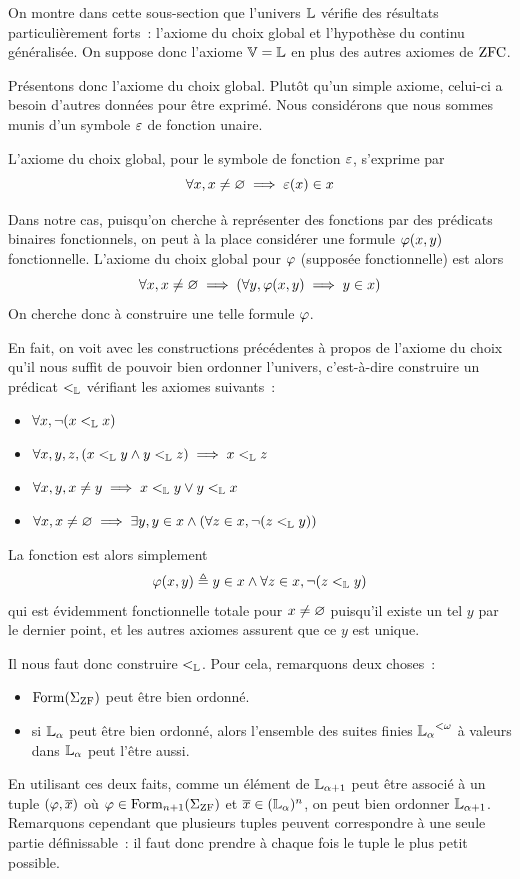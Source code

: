 On montre dans cette sous-section que l'univers $\mathbb L$ vérifie des résultats
particulièrement forts~: l'axiome du choix global et l'hypothèse du continu
généralisée. On suppose donc l'axiome $\mathbb V = \mathbb L$ en plus des autres axiomes de
$\operatorname{ZFC}$.

Présentons donc l'axiome du choix global. Plutôt qu'un simple axiome, celui-ci
a besoin d'autres données pour être exprimé. Nous considérons que nous sommes
munis d'un symbole $\varepsilon$ de fonction unaire.

\begin{axiom}
  L'axiome du choix global, pour le symbole de fonction $\varepsilon$, s'exprime par
  \[\forall x, x\neq \varnothing \implies \varepsilon(x)\in x\]
\end{axiom}

Dans notre cas, puisqu'on cherche à représenter des fonctions par des prédicats
binaires fonctionnels, on peut à la place considérer une formule $\varphi(x,y)$
fonctionnelle. L'axiome du choix global pour $\varphi$ (supposée fonctionnelle)
est alors
\[\forall x, x \neq \varnothing \implies (\forall y, \varphi(x,y)\implies y\in x)\]
On cherche donc à construire une telle formule $\varphi$.

En fait, on voit avec les constructions précédentes à propos de l'axiome du
choix qu'il nous suffit de pouvoir bien ordonner l'univers, c'est-à-dire
construire un prédicat $<_{\mathbb L}$ vérifiant les axiomes suivants~:
\begin{itemize}
\item $\forall x, \lnot(x <_{\mathbb L} x)$
\item $\forall x,y,z, (x <_{\mathbb L} y \land y <_{\mathbb L} z) \implies x <_{\mathbb L} z$
\item $\forall x,y, x\neq y \implies x <_{\mathbb L} y \lor y <_{\mathbb L} x$
\item $\forall x, x\neq \varnothing \implies
  \exists y, y \in x \land (\forall z \in x, \lnot (z <_{\mathbb L} y))$
\end{itemize}
La fonction est alors simplement
\[\varphi(x,y) \triangleq y \in x \land \forall z \in x, \lnot(z <_{\mathbb L} y)\]
qui est évidemment fonctionnelle totale pour $x\neq \varnothing$ puisqu'il existe un
tel $y$ par le dernier point, et les autres axiomes assurent que ce $y$ est
unique.

Il nous faut donc construire $<_{\mathbb L}$. Pour cela, remarquons deux choses~:
\begin{itemize}
\item $\operatorname{Form}(\Sigma_{\operatorname{ZF}})$ peut être bien ordonné.
\item si $\mathbb L_{\alpha}$ peut être bien ordonné, alors l'ensemble des suites finies
  ${\mathbb L_{\alpha}}^{<\omega}$ à valeurs dans $\mathbb L_{\alpha}$ peut l'être aussi.
\end{itemize}
En utilisant ces deux faits, comme un élément de $\mathbb L_{\alpha + 1}$
peut être associé à un tuple $(\varphi,\overline{x})$ où
$\varphi\in\operatorname{Form}_{n+1}(\Sigma_{\operatorname{ZF}})$ et $\overline{x} \in(\mathbb L_{\alpha})^n$, on peut bien
ordonner $\mathbb L_{\alpha + 1}$. Remarquons cependant que plusieurs tuples peuvent
correspondre à une seule partie définissable~: il faut donc prendre à chaque
fois le tuple le plus petit possible.


